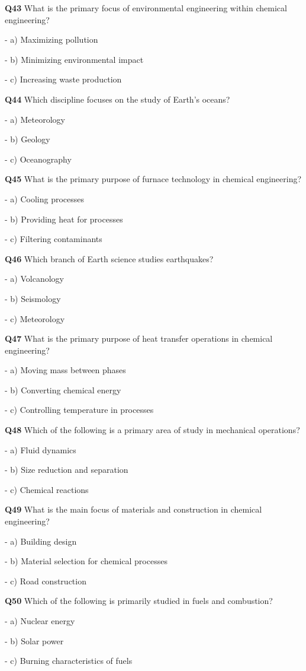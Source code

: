 \textbf{Q43} What is the primary focus of environmental engineering within chemical engineering?\par
\quad - a) Maximizing pollution\par
\quad - b) Minimizing environmental impact\par
\quad - c) Increasing waste production\par

\textbf{Q44} Which discipline focuses on the study of Earth's oceans?\par
\quad - a) Meteorology\par
\quad - b) Geology\par
\quad - c) Oceanography\par

\textbf{Q45} What is the primary purpose of furnace technology in chemical engineering?\par
\quad - a) Cooling processes\par
\quad - b) Providing heat for processes\par
\quad - c) Filtering contaminants\par

\textbf{Q46} Which branch of Earth science studies earthquakes?\par
\quad - a) Volcanology\par
\quad - b) Seismology\par
\quad - c) Meteorology\par

\textbf{Q47} What is the primary purpose of heat transfer operations in chemical engineering?\par
\quad - a) Moving mass between phases\par
\quad - b) Converting chemical energy\par
\quad - c) Controlling temperature in processes\par

\textbf{Q48} Which of the following is a primary area of study in mechanical operations?\par
\quad - a) Fluid dynamics\par
\quad - b) Size reduction and separation\par
\quad - c) Chemical reactions\par

\textbf{Q49} What is the main focus of materials and construction in chemical engineering?\par
\quad - a) Building design\par
\quad - b) Material selection for chemical processes\par
\quad - c) Road construction\par

\textbf{Q50} Which of the following is primarily studied in fuels and combustion?\par
\quad - a) Nuclear energy\par
\quad - b) Solar power\par
\quad - c) Burning characteristics of fuels\par